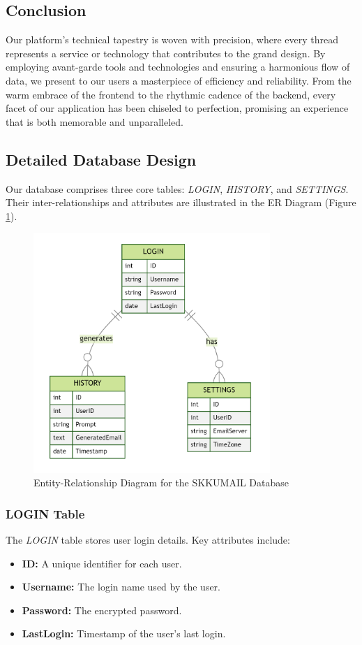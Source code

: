 \subsection{Conclusion}

Our platform's technical tapestry is woven with precision, where every thread represents a service or technology that contributes to the grand design. By employing avant-garde tools and technologies and ensuring a harmonious flow of data, we present to our users a masterpiece of efficiency and reliability. From the warm embrace of the frontend to the rhythmic cadence of the backend, every facet of our application has been chiseled to perfection, promising an experience that is both memorable and unparalleled.


\subsection{Detailed Database Design}

Our database comprises three core tables: \textit{LOGIN}, \textit{HISTORY}, and \textit{SETTINGS}. Their inter-relationships and attributes are illustrated in the ER Diagram (Figure \ref{fig:er_diagram}). 

\begin{figure}[ht]
	\centering
	\includegraphics[width=0.8\textwidth]{ER_Diagram.png}
	\caption{Entity-Relationship Diagram for the SKKUMAIL Database}
	\label{fig:er_diagram}
\end{figure}

\subsubsection{LOGIN Table}
The \textit{LOGIN} table stores user login details. Key attributes include:
\begin{itemize}
	\item \textbf{ID:} A unique identifier for each user.
	\item \textbf{Username:} The login name used by the user.
	\item \textbf{Password:} The encrypted password.
	\item \textbf{LastLogin:} Timestamp of the user's last login.
\end{itemize}

